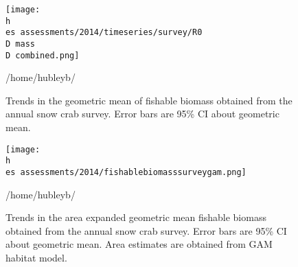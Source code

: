 \documentclass[11pt]{article}
\newcommand{\D}{.}
\newcommand{\h}{/home/hubleyb/}
\newcommand{\es}{bio.data/bio.snowcrab/}
\begin{document}
\begin{figure}
\centering
\texttt{[image: \\h \\es assessments/2014/timeseries/survey/R0\\D mass\\D combined.png]}\\ 
\caption{Trends in the geometric mean of fishable biomass obtained from the annual snow crab survey. Error bars are 95\% CI about geometric mean.}
\h \end{figure} %
\clearpage




\begin{figure}
\centering
\texttt{[image: \\h \\es assessments/2014/fishablebiomasssurveygam.png]}\\ 
\caption{Trends in the area expanded geometric mean fishable biomass obtained from the annual snow crab survey. Error bars are 95\% CI about geometric mean. Area estimates are obtained from GAM habitat model.}
\h \end{figure} %
\clearpage





\end{document}
